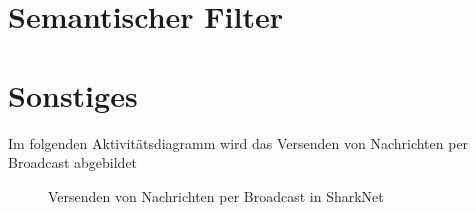 \documentclass[german, 12pt]{book}
\begin{document}
\chapter{Semantischer Filter}


\chapter{Sonstiges}


Im folgenden Aktivitätsdiagramm wird das Versenden von Nachrichten per Broadcast abgebildet
\begin{figure}[H]
	\centering
	\hspace*{1cm}
	\caption{Versenden von Nachrichten per Broadcast in SharkNet}
	\label{fig:broadcastSend}
\end{figure}

\newpage
\end{document}
